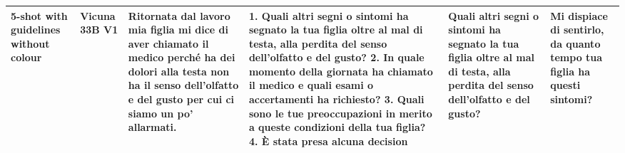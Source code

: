 \begin{table}[!htbp]
\begin{tabularx}{\linewidth}{p{2.5cm}| p{1.5cm} | p{2cm} | X | p{2cm} | p{2cm} }
\midrule
\textbf{5-shot with guidelines without colour} &  Vicuna 33B V1  & Ritornata dal lavoro mia figlia mi dice di aver chiamato il medico perché ha dei dolori alla testa non ha il senso dell'olfatto e del gusto per cui ci siamo un po' allarmati. & 1. Quali altri segni o sintomi ha segnato la tua figlia oltre al mal di testa, alla perdita del senso dell'olfatto e del gusto? 2. In quale momento della giornata ha chiamato il medico e quali esami o accertamenti ha richiesto? 3. Quali sono le tue preoccupazioni in merito a queste condizioni della tua figlia? 4. È stata presa alcuna decision & Quali altri segni o sintomi ha segnato la tua figlia oltre al mal di testa, alla perdita del senso dell'olfatto e del gusto? &Mi dispiace di sentirlo, da quanto tempo tua figlia ha questi sintomi? \\
        \bottomrule
    \end{tabularx}
\end{table}
